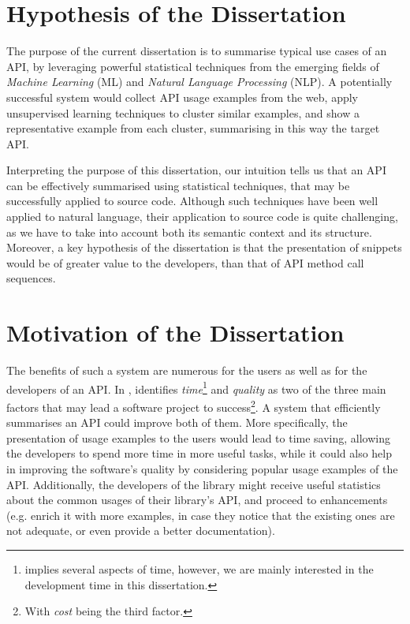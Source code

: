 \section{Hypothesis of the Dissertation}
\label{sec:hypothesis}

The purpose of the current dissertation is to summarise typical use cases of an API, by leveraging powerful statistical techniques from the emerging fields of \textit{Machine Learning} (ML) and \textit{Natural Language Processing} (NLP). A potentially successful system would collect API usage examples from the web, apply unsupervised learning techniques to cluster similar examples, and show a representative example from each cluster, summarising in this way the target API.

Interpreting the purpose of this dissertation, our intuition tells us that an API can be effectively summarised using statistical techniques, that may be successfully applied to source code. Although such techniques have been well applied to natural language, their application to source code is quite challenging, as we have to take into account both its semantic context and its structure. Moreover, a key hypothesis of the dissertation is that the presentation of snippets would be of greater value to the developers, than that of API method call sequences.


\section{Motivation of the Dissertation}
\label{sec:motivation}

The benefits of such a system are numerous for the users as well as for the developers of an API. In \cite{Spinellis:2006},  identifies \textit{time}\footnote{ implies several aspects of time, however, we are mainly interested in the development time in this dissertation.} and \textit{quality} as two of the three main factors that may lead a software project to success\footnote{With \textit{cost} being the third factor.}. A system that efficiently summarises an API could improve both of them. More specifically, the presentation of usage examples to the users would lead to time saving, allowing the developers to spend more time in more useful tasks, while it could also help in improving the software's quality by considering popular usage examples of the API. Additionally, the developers of the library might receive useful statistics about the common usages of their library's API, and proceed to enhancements (e.g. enrich it with more examples, in case they notice that the existing ones are not adequate, or even provide a better documentation). 

